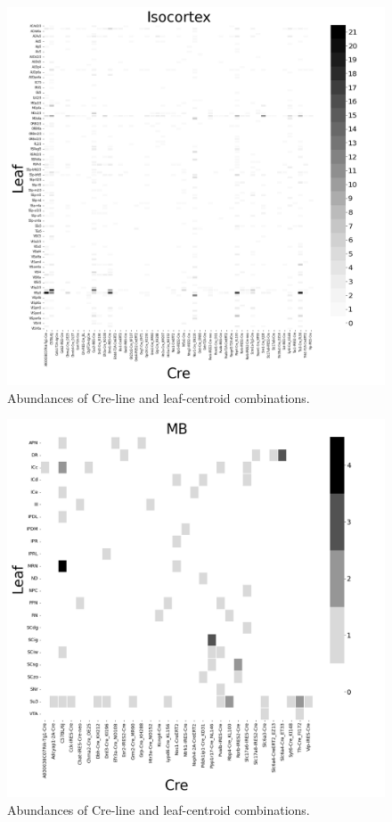 \begin{figure}[H]
    \centering
    \includegraphics[width = 7in]{figs/Isocortex centroid density.png}
     \caption{Abundances of Cre-line and leaf-centroid combinations.}
    \label{fig:iso_count}
\end{figure}
\newpage

\begin{figure}[H]
    \centering
    \includegraphics[width = 7in]{figs/MB centroid density.png} 
     \caption{Abundances of Cre-line and leaf-centroid combinations.}
    \label{fig:my_label}
\end{figure}
\newpage

